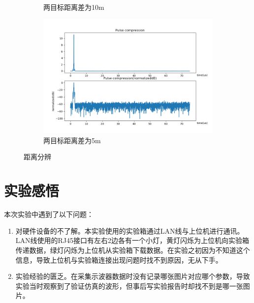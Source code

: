 \documentclass{article}
\newcounter{sub}
\begin{document}
\begin{figure}[H]
\begin{subfigure}[H]{.45\linewidth}
		\caption{两目标距离差为10m}
		\label{fig:两目标距离差为10m}
	\end{subfigure}
	\quad
	\begin{subfigure}[H]{.45\linewidth}
		\centering
		\includegraphics[width=\linewidth]{distance5-pulse-software.png}
		\caption{两目标距离差为5m}
		\label{fig:两目标距离差为5m}
	\end{subfigure}
	\caption{距离分辨}
	\label{fig:距离分辨}
\end{figure}

\section{实验感悟}%
\label{sec:实验感悟}

本次实验中遇到了以下问题：

\begin{enumerate}
	\item 对硬件设备的不了解。本实验使用的实验箱通过LAN线与上位机进行通讯。LAN线使用的RJ45接口有左右2边各有一个小灯，黄灯闪烁为上位机向实验箱传递数据，绿灯闪烁为上位机从实验箱下载数据。在实验之初因为不知道这个信息，导致上位机与实验箱连接出现问题时找不到原因，无从下手。
	\item 实验经验的匮乏。在采集示波器数据时没有记录哪张图片对应哪个参数，导致实验当时观察到了验证仿真的波形，但事后写实验报告时却找不到是哪一张图片。
\end{enumerate}

\newpage





\end{document}
